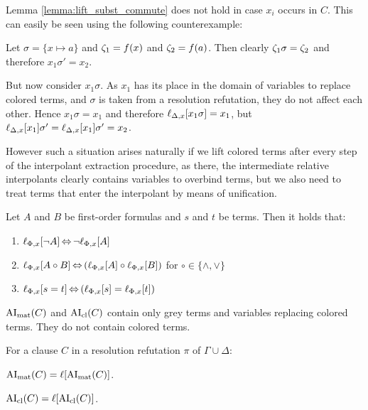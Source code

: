 \documentclass[,%
	paper=a4,%
	DIV12, %
	twoside=false,%
	liststotoc,
	bibtotoc,
	draft=false,%
	numbers=noendperiod
]{scrartcl}
\begin{document}
\begin{remark}
	Lemma \ref{lemma:lift_subst_commute} does not hold in case $x_i$ occurs in $C$.
	This can easily be seen using the following counterexample:


	Let $\sigma = \{x \mapsto a\}$ and $\colterm{1} = f(x)$ and $\colterm{2} = f(a)$. 
	Then clearly $\colterm{1}\sigma = \colterm{2}$ and therefore $x_1\sigma' = x_2$.

	But now consider $x_1 \sigma$. 
	As $x_1$ has its place in the domain of variables to replace colored terms, and $\sigma$ is taken from a resolution refutation, they do not affect each other. 
	Hence $x_1\sigma = x_1$ and therefore $\lifdelta{x_1\sigma} = x_1$, but $\lifdelta{x_1}\sigma' = \lifdelta{x_1}\sigma' = x_2$.


	However such a situation arises naturally if we lift colored terms after every step of the interpolant extraction procedure, as there, the intermediate relative interpolants clearly contains variables to overbind terms, but we also need to treat terms that enter the interpolant by means of unification.
\end{remark}

\begin{lemma}
	\label{lemma:lift_logic_commute}
	Let $A$ and $B$ be first-order formulas and $s$ and $t$ be terms. Then it holds that:
	\begin{enumerate}
		\item $\lift{\Phi}{\lnot A}{x} \semiff{} \lnot \lift{\Phi}{A}{x}$
		\item $\lift{\Phi}{A \circ B}{x} \semiff{} ( \lift{\Phi}{A}{x} \circ \lift{\Phi}{B}{x} )$ for  $\circ \in     \{\land, \lor\}$
		\item $\lift{\Phi}{s = t}{x} \semiff{} ( \lift{\Phi}{s}{x} = \lift{\Phi}{t}{x} )$
	\end{enumerate}
\end{lemma}



\begin{lemma}
	\label{lemma:no_colored_terms}
	$\AImatrix(C)$ and $\AIclause(C)$ contain only grey terms and variables replacing colored terms. They do not contain colored terms.
\end{lemma}



\begin{corr}
	\label{corr:lift_ai}
	For a clause $C$ in a resolution refutation $\pi$ of $\Gamma \cup \Delta$:
	\begin{compactenum}
	\item $\AImatrix(C) = \lifboth{\AImatrix(C)}$.

	\item $\AIclause(C) = \lifboth{\AIclause(C)}$.
	\end{compactenum}
\end{corr}
\end{document}
